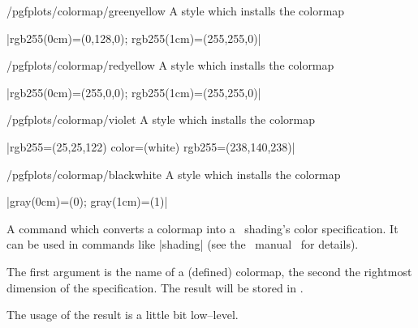 \begin{stylekey}{/pgfplots/colormap/greenyellow}
	A style which installs the colormap

	|{rgb255(0cm)=(0,128,0); rgb255(1cm)=(255,255,0)}|

\end{stylekey}

\begin{stylekey}{/pgfplots/colormap/redyellow}
	A style which installs the colormap

	|{rgb255(0cm)=(255,0,0); rgb255(1cm)=(255,255,0)}|

\end{stylekey}

\begin{stylekey}{/pgfplots/colormap/violet}
	A style which installs the colormap

	|{rgb255=(25,25,122) color=(white) rgb255=(238,140,238)}|

\end{stylekey}

\begin{stylekey}{/pgfplots/colormap/blackwhite}
	A style which installs the colormap

	|{gray(0cm)=(0); gray(1cm)=(1)}|

\end{stylekey}

\begin{command}{\pgfplotscolormaptoshadingspec{}}
	A command which converts a colormap into a \PGF\ shading's color specification. It can be used in commands like |\pgfdeclare*shading| (see the \PGF\ manual~\cite{tikz} for details).

	The first argument is the name of a (defined) colormap, the second the rightmost dimension of the specification. The result will be stored in .
\begin{codeexample}[]
	\result
	\def\tempb{\pgfdeclarehorizontalshading{tempshading}{1cm}}%
	\expandafter\tempb\expandafter{\result}%
\end{codeexample}
The usage of the result  is a little bit low--level.
\end{command}


